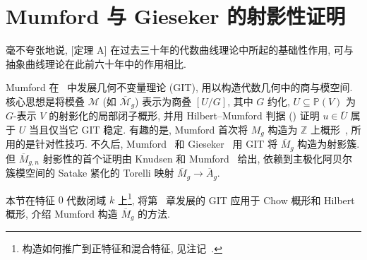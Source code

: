 \section{Mumford 与 Gieseker 的射影性证明}\label{src:6.8}
\begin{epigraph}
毫不夸张地说, [定理 A] 在过去三十年的代数曲线理论中所起的基础性作用, 可与抽象曲线理论在此前六十年中的作用相比.
\end{epigraph}
Mumford 在~\cite{GIT} 中发展几何不变量理论 (GIT), 用以构造代数几何中的商与模空间. 核心思想是将模叠 $\mathcal M$ (如 $\overline{\mathcal M}_g$) 表示为商叠 $[U/G]$, 其中 $G$ 约化, $U\subseteq\mathbb P(V)$ 为 $G$-表示 $V$ 的射影化的局部闭子概形, 并用 Hilbert--Mumford 判据 () 证明 $u\in\overline U$ 属于 $U$ 当且仅当它 GIT 稳定. 有趣的是, Mumford 首次将 $M_g$ 构造为 $\mathbb Z$ 上概形~\cite[定理 5.11, 7.13]{GIT}, 所用的是针对性技巧. 不久后, Mumford~\cite{Mum77} 和 Gieseker~\cite{Gie82} 用 GIT 将 $\overline M_g$ 构造为射影簇. 但 $\overline M_{g,\allowbreak n}$ 射影性的首个证明由 Knudsen 和 Mumford~\cite{KM76,Knu83a,Knu83b} 给出, 依赖到主极化阿贝尔簇模空间的 Satake 紧化的 Torelli 映射 $\overline M_g\to\overline A_g$.

本节在特征 $0$ 代数闭域 $k$ 上\footnote{构造如何推广到正特征和混合特征, 见注记~.}, 将第~ 章发展的 GIT 应用于 Chow 概形和 Hilbert 概形, 介绍 Mumford 构造 $\overline M_g$ 的方法.
